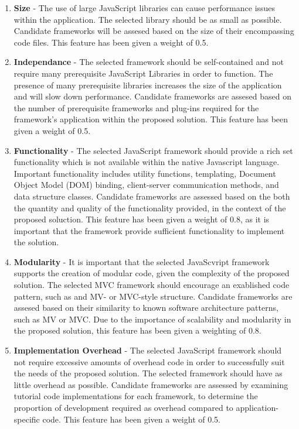 \documentclass{report}
\begin{document}
\begin{enumerate}

\item \textbf{Size} - The use of large JavaScript libraries can cause performance issues within the application. The selected library should be as small as possible. Candidate frameworks will be assesed based on the size of their encompassing code files. This feature has been given a weight of 0.5.

\item \textbf{Independance} - The selected framework should be self-contained and not require many prerequisite JavaScript Libraries in order to function. The presence of many prerequisite libraries increases the size of the application and will slow down performance. Candidate frameworks are assesed based on the number of prerequisite frameworks and plug-ins required for the framework's application within the proposed solution. This feature has been given a weight of 0.5.

\item \textbf{Functionality} - The selected JavaScript framework should provide a rich set functionality which is not available within the native Javascript language. Important functionality includes utility functions, templating, Document Object Model (DOM) binding, client-server communication methods, and data structure classes. Candidate frameworks are assessed based on the both the quantity and quality of the functionality provided, in the context of the proposed soluction. This feature has been given a weight of 0.8, as it is important that the framework provide sufficient functionality to implement the solution.

\item \textbf{Modularity} - It is important that the selected JavaScvript framework supports the creation of modular code, given the complexity of the proposed solution. The selected MVC framework should encourage an exablished code pattern, such as and MV- or MVC-style structure. Candidate frameworks are assesed based on their similarity to known software architecture patterns, such as MV or MVC. Due to the importance of scalability and modularity in the proposed solution, this feature has been given a weighting of 0.8.

\item \textbf{Implementation Overhead} - The selected JavaScript framework should not require excessive amounts of overhead code in order to successfully suit the needs of the proposed solution. The selected framework should have as little overhead as possible. Candidate frameworks are assessed by examining tutorial code implementations for each framework, to determine the proportion of development required as overhead compared to application-specific code. This feature has been given a weight of 0.5.

\end{enumerate}
\end{document}
